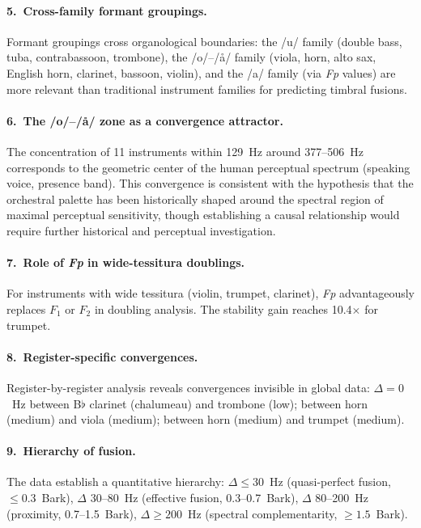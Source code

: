 \documentclass[12pt,a4paper]{article}
\begin{document}
\paragraph{5.\ Cross-family formant groupings.}
Formant groupings cross organological boundaries: the /u/ family (double bass,
tuba, contrabassoon, trombone), the /o/--/\aa/ family (viola, horn, alto sax,
English horn, clarinet, bassoon, violin), and the /a/ family (via \textit{Fp}
values) are more relevant than traditional instrument families for predicting
timbral fusions.

\paragraph{6.\ The /o/--/\aa/ zone as a convergence attractor.}
The concentration of 11 instruments within 129~Hz around 377--506~Hz corresponds
to the geometric center of the human perceptual spectrum (speaking voice,
presence band). This convergence is consistent with the hypothesis that the
orchestral palette has been historically shaped around the spectral region of
maximal perceptual sensitivity, though establishing a causal relationship would
require further historical and perceptual investigation.

\paragraph{7.\ Role of \textit{Fp} in wide-tessitura doublings.}
For instruments with wide tessitura (violin, trumpet, clarinet), \textit{Fp}
advantageously replaces $F_1$ or $F_2$ in doubling analysis. The stability gain
reaches 10.4$\times$ for trumpet.

\paragraph{8.\ Register-specific convergences.}
Register-by-register analysis reveals convergences invisible in global data:
$\Delta = 0$~Hz between B$\flat$ clarinet (chalumeau) and trombone (low);
between horn (medium) and viola (medium); between horn (medium) and trumpet
(medium).

\paragraph{9.\ Hierarchy of fusion.}
The data establish a quantitative hierarchy: $\Delta \leq 30$~Hz (quasi-perfect
fusion, $\leq 0.3$~Bark), $\Delta$ 30--80~Hz (effective fusion, 0.3--0.7~Bark),
$\Delta$ 80--200~Hz (proximity, 0.7--1.5~Bark), $\Delta \geq 200$~Hz
(spectral complementarity, $\geq 1.5$~Bark).
\end{document}
